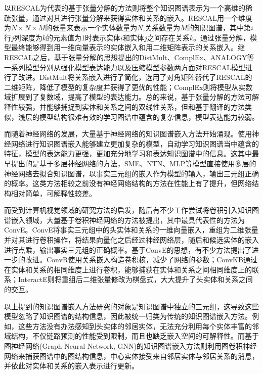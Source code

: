 以RESCAL为代表的基于张量分解的方法则将整个知识图谱表示为一个高维的稀疏张量，通过对其进行张量分解来获得实体和关系的嵌入。RESCAL用一个维度为$N\times N\times M$的张量来表示一个实体数量为$N$,关系数量为$M$的知识图谱，其中第$i$行$j$列深度为$k$的元素值为1时表示实体$i$和实体$j$之间存在关系$k$。通过张量分解，模型最终能够得到用一维向量表示的实体嵌入和用二维矩阵表示的关系嵌入。继RESCAL之后，基于张量分解的思想提出的DistMult、ComplEx、ANALOGY等一系列模型分别从强化模型表达能力以及压缩模型参数两方面对RESCAL模型进行了改进。DistMult将关系嵌入进行了简化，选用了对角矩阵替代了RESCAL的二维矩阵，降低了模型的复杂度并获得了更优的性能；ComplEx则将模型从实数域扩展到了复数域，提高了模型的表达能力。总的来说，基于张量分解的方法可解释性较强，并能够捕捉到实体和关系之间的双线性关系，但和基于翻译的方法类似，浅层的模型结构很难有效的学习图谱中蕴含的复杂信息，模型表达能力较弱。

而随着神经网络的发展，大量基于神经网络的知识图谱嵌入方法开始涌现。使用神经网络进行知识图谱嵌入能够建立更加复杂的模型，自动学习知识图谱当中蕴含的特征，模型的表达能力更强，更加充分地学习和表达知识图谱中的信息。这其中最早提出的是基于多层神经网络的方法，SME、NTN、MLP等模型直接使用多层的神经网络去拟合知识图谱，以事实三元组的嵌入作为模型的输入，输出三元组正确的概率。这类方法相较之前没有神经网络结构的方法在性能上有了提升，但网络结构相对简单，可解释性较差。

而受到计算机视觉领域的研究方法的启发，随后有不少工作尝试将卷积引入知识图谱嵌入领域，大量基于卷积神经网络的方法被提出，其中最具代表性的方法为ConvE。ConvE将事实三元组中的头实体和关系的一维向量嵌入，重组为二维张量并对其进行卷积操作，将结果向量化之后经过神经网络层，随后和候选实体的嵌入进行点乘，输出事实三元组的正确概率。基于ConvE的思想，有不少方法提出了进一步的改进。ConvR使用关系嵌入构造卷积核，减少了网络的参数；ConvKB通过在实体和关系的相同维度上进行卷积，能够捕获在实体和关系之间相同维度上的联系；InteractE则将重组后二维张量修改为棋盘式，大大提升了头实体和关系之间的交互。

以上提到的知识图谱嵌入方法研究的对象是知识图谱中独立的三元组，这导致这些模型忽略了知识图谱的结构信息，因此被统一归类为传统的知识图谱嵌入方法。例如，这些方法没有办法感知到头实体的邻居实体，无法充分利用每个实体丰富的邻域结构，不仅链路预测的性能受到限制，而且也缺乏嵌入空间的可解释性。而基于图神经网络(Graph Neural Network, GNN)的知识图谱嵌入方法则利用图卷积神经网络来捕获图谱中的图结构信息，中心实体接受来自邻居实体与邻居关系的消息，并依此对实体和关系的嵌入表示进行更新。

